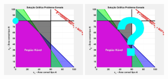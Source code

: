 \documentclass{beamer}
\begin{document}
\begin{frame}
{	}
	\only<8>
	{
		\centering
		\includegraphics[width=4.2cm,height=4.2cm]{Exaustiva_7.jpeg}
	}
	\only<9->
	{
		\centering
		\includegraphics[width=4.2cm,height=4.2cm]{Exaustiva_1.jpeg}
	}


\end{frame}
\end{document}
